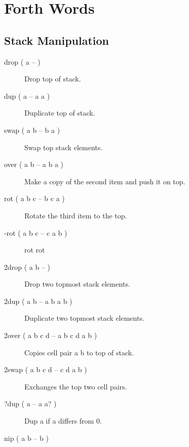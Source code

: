 \chapter{Forth Words}

\section{Stack Manipulation}

\begin{description}

\item[drop ( a -- )]

Drop top of stack.

\item[dup ( a -- a a )]

Duplicate top of stack.

\item[swap ( a b -- b a )]

Swap top stack elements.

\item[over ( a b -- a b a )]

Make a copy of the second item and push it on top.

\item[rot ( a b c -- b c a )]

Rotate the third item to the top.

\item[-rot ( a b c -- c a b )]

rot rot

\item[2drop ( a b -- )]

Drop two topmost stack elements.

\item[2dup ( a b -- a b a b )]

Duplicate two topmost stack elements.

\item[2over ( a b c d -- a b c d a b )]

Copies cell pair a b to top of stack.

\item[2swap ( a b c d -- c d a b )]

Exchanges the top two cell pairs.

\item[?dup ( a -- a a? )]

Dup a if a differs from 0.

\item[nip ( a b -- b )]


\end{description}
